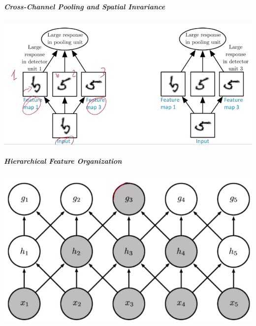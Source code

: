 \documentclass[10pt]{report}
\begin{document}
\subparagraph{Cross-Channel Pooling and Spatial Invariance}
\begin{center}
	\includegraphics[scale=0.5]{60.png}
\end{center}
\subparagraph{Hierarchical Feature Organization}
\begin{center}
	\includegraphics[scale=0.5]{61.png}
\end{center}
\end{document}

